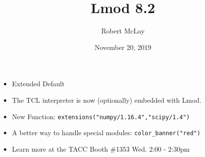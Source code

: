 \documentclass{beamer}
\begin{document}
\title[Lmod]{Lmod 8.2}
\author{Robert McLay} 
\date{November 20, 2019} 

\frame{\titlepage} 


\begin{frame}{}
  \begin{itemize}
    \item Extended Default
    \item The TCL interpreter is now (optionally) embedded with Lmod.
    \item New Function: \texttt{extensions("numpy/1.16.4","scipy/1.4")}
    \item A better way to handle special modules: \texttt{color\_banner("red")}
    \item Learn more at the TACC Booth \#1353 \@ Wed. 2:00 - 2:30pm
  \end{itemize}
\end{frame}
\end{document}
